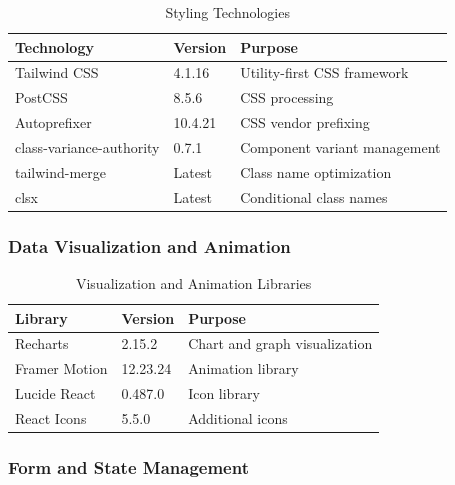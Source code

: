 \documentclass[12pt,a4paper]{article}
\begin{document}
    \begin{table}[H]
        \caption{Styling Technologies}
        \begin{tabular}{|l|l|p{6cm}|}
            \hline
            \textbf{Technology} & \textbf{Version} & \textbf{Purpose} \\
            \hline
            Tailwind CSS & 4.1.16 & Utility-first CSS framework \\
            \hline
            PostCSS & 8.5.6 & CSS processing \\
            \hline
            Autoprefixer & 10.4.21 & CSS vendor prefixing \\
            \hline
            class-variance-authority & 0.7.1 & Component variant management \\
            \hline
            tailwind-merge & Latest & Class name optimization \\
            \hline
            clsx & Latest & Conditional class names \\
            \hline
        \end{tabular}
    \end{table}

    \subsubsection{Data Visualization and Animation}

    \begin{table}[H]
        \caption{Visualization and Animation Libraries}
        \begin{tabular}{|l|l|p{6cm}|}
            \hline
            \textbf{Library} & \textbf{Version} & \textbf{Purpose} \\
            \hline
            Recharts & 2.15.2 & Chart and graph visualization \\
            \hline
            Framer Motion & 12.23.24 & Animation library \\
            \hline
            Lucide React & 0.487.0 & Icon library \\
            \hline
            React Icons & 5.5.0 & Additional icons \\
            \hline
        \end{tabular}
    \end{table}

    \subsubsection{Form and State Management}
\end{document}
